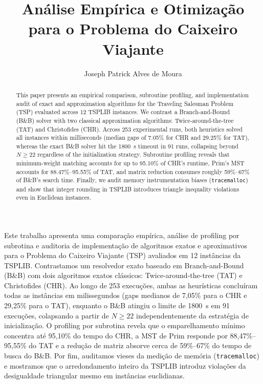 \documentclass[12pt]{article}
\title{Análise Empírica e Otimização para o Problema do Caixeiro Viajante}
\author{Joseph Patrick Alves de Moura}
\begin{document}
 

\maketitle

\begin{abstract}
  This paper presents an empirical comparison, subroutine profiling, and implementation audit of exact and approximation algorithms for the Traveling Salesman Problem (TSP) evaluated across 12 TSPLIB instances. We contrast a Branch-and-Bound (B\&B) solver with two classical approximation algorithms: Twice-around-the-tree (TAT) and Christofides (CHR). Across 253 experimental runs, both heuristics solved all instances within milliseconds (median gaps of 7.05\% for CHR and 29.25\% for TAT), whereas the exact B\&B solver hit the 1800~s timeout in 91 runs, collapsing beyond $N\geq22$ regardless of the initialization strategy. Subroutine profiling reveals that minimum-weight matching accounts for up to 95.10\% of CHR's runtime, Prim's MST accounts for 88.47\%--95.55\% of TAT, and matrix reduction consumes roughly 59\%--67\% of B\&B's search time. Finally, we audit memory instrumentation biases (\texttt{tracemalloc}) and show that integer rounding in TSPLIB introduces triangle inequality violations even in Euclidean instances.
\end{abstract}
     
\begin{resumo} 
  Este trabalho apresenta uma comparação empírica, análise de profiling por subrotina e auditoria de implementação de algoritmos exatos e aproximativos para o Problema do Caixeiro Viajante (TSP) avaliados em 12 instâncias da TSPLIB. Contrastamos um resolvedor exato baseado em Branch-and-Bound (B\&B) com dois algoritmos exatos clássicos: Twice-around-the-tree (TAT) e Christofides (CHR). Ao longo de 253 execuções, ambas as heurísticas concluíram todas as instâncias em milissegundos (gaps medianos de 7,05\% para o CHR e 29,25\% para o TAT), enquanto o B\&B atingiu o limite de 1800~s em 91 execuções, colapsando a partir de $N\geq22$ independentemente da estratégia de inicialização. O profiling por subrotina revela que o emparelhamento mínimo concentra até 95,10\% do tempo do CHR, a MST de Prim responde por 88,47\%--95,55\% do TAT e a redução de matriz absorve cerca de 59\%--67\% do tempo de busca do B\&B. Por fim, auditamos vieses da medição de memória (\texttt{tracemalloc}) e mostramos que o arredondamento inteiro da TSPLIB introduz violações da desigualdade triangular mesmo em instâncias euclidianas.
\end{resumo}
\end{document}
